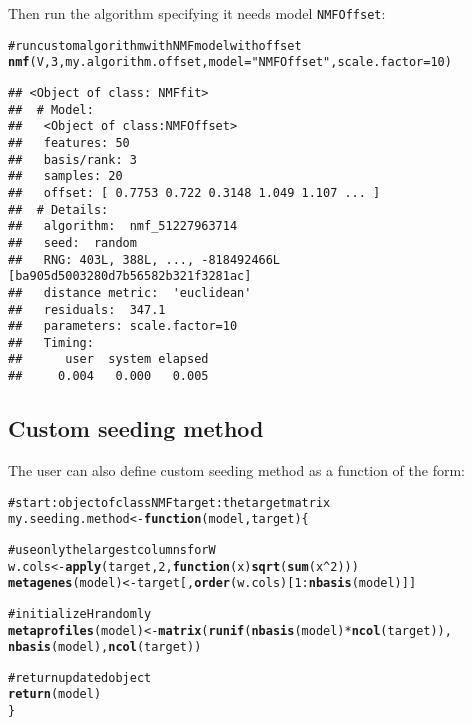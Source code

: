 \documentclass[a4paper]{article}\usepackage{graphicx, color}
\makeatletter
\newcommand{\hlfunctioncall}[1]{\textcolor[rgb]{0.501960784313725,0,0.329411764705882}{\textbf{#1}}}%
\newcommand{\hlstring}[1]{\textcolor[rgb]{0.6,0.6,1}{#1}}%
\newcommand{\hlcomment}[1]{\textcolor[rgb]{0.180392156862745,0.6,0.341176470588235}{#1}}%
\newenvironment{kframe}{%
 \def\at@end@of@kframe{}%
 \ifinner\ifhmode%
  \def\at@end@of@kframe{\end{minipage}}%
  \begin{minipage}{\columnwidth}%
 \fi\fi%
 \def\FrameCommand##1{\hskip\@totalleftmargin \hskip-\fboxsep
 \colorbox{shadecolor}{##1}\hskip-\fboxsep
     \hskip-\linewidth \hskip-\@totalleftmargin \hskip\columnwidth}%
 \MakeFramed {\advance\hsize-\width
   \@totalleftmargin\z@ \linewidth\hsize
   \@setminipage}}%
 {\par\unskip\endMakeFramed%
 \at@end@of@kframe}
\newenvironment{knitrout}{}{} %
\let\code=\texttt
\makeatother
\begin{document}
Then run the algorithm specifying it needs model \code{NMFOffset}:
\begin{knitrout}
\color{fgcolor}\begin{kframe}
\begin{alltt}
\hlcomment{# run custom algorithm with NMF model with offset}
\hlfunctioncall{nmf}(V, 3, my.algorithm.offset, model = \hlstring{"NMFOffset"}, scale.factor = 10)
\end{alltt}
\begin{verbatim}
## <Object of class: NMFfit>
##  # Model:
##   <Object of class:NMFOffset>
##   features: 50 
##   basis/rank: 3 
##   samples: 20 
##   offset: [ 0.7753 0.722 0.3148 1.049 1.107 ... ]
##  # Details:
##   algorithm:  nmf_51227963714 
##   seed:  random 
##   RNG: 403L, 388L, ..., -818492466L [ba905d5003280d7b56582b321f3281ac]
##   distance metric:  'euclidean' 
##   residuals:  347.1 
##   parameters: scale.factor=10 
##   Timing:
##      user  system elapsed 
##     0.004   0.000   0.005
\end{verbatim}
\end{kframe}
\end{knitrout}



\subsection{Custom seeding method}\label{sec:seed_custom}

The user can also define custom seeding method as a function of the form:


\begin{knitrout}
\color{fgcolor}\begin{kframe}
\begin{alltt}

\hlcomment{# start: object of class NMF target: the target matrix}
my.seeding.method <- \hlfunctioncall{function}(model, target) \{
    
\hlcomment{    # use only the largest columns for W}
    w.cols <- \hlfunctioncall{apply}(target, 2, \hlfunctioncall{function}(x) \hlfunctioncall{sqrt}(\hlfunctioncall{sum}(x^2)))
    \hlfunctioncall{metagenes}(model) <- target[, \hlfunctioncall{order}(w.cols)[1:\hlfunctioncall{nbasis}(model)]]
    
\hlcomment{    # initialize H randomly}
    \hlfunctioncall{metaprofiles}(model) <- \hlfunctioncall{matrix}(\hlfunctioncall{runif}(\hlfunctioncall{nbasis}(model) * \hlfunctioncall{ncol}(target)), 
        \hlfunctioncall{nbasis}(model), \hlfunctioncall{ncol}(target))
    
\hlcomment{    # return updated object}
    \hlfunctioncall{return}(model)
\}
\end{alltt}
\end{kframe}
\end{knitrout}
\end{document}
